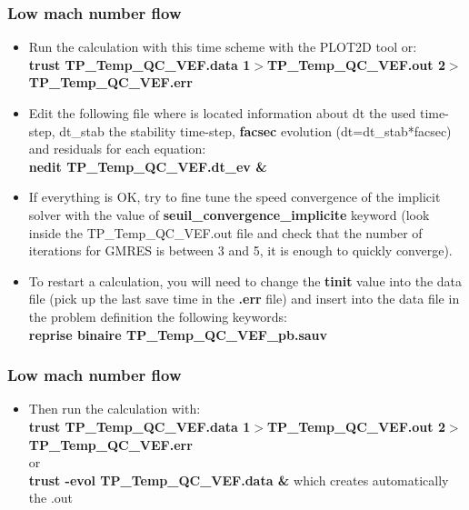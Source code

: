 \documentclass[10pt, hyperref={unicode=true,pdfusetitle, bookmarks=true,bookmarksnumbered=false,bookmarksopen=false, breaklinks=false,pdfborder={0 0 1},backref=true,colorlinks=true,linkcolor=darkblue,pageanchor}]{beamer}
\begin{document}
\begin{frame}
\frametitle{Low mach number flow}
\begin{block}{}

\begin{itemize}
\item Run the calculation with this time scheme with the PLOT2D tool or: \\
{\footnotesize{\textbf{trust TP\_Temp\_QC\_VEF.data 1$>$TP\_Temp\_QC\_VEF.out 2$>$TP\_Temp\_QC\_VEF.err}}}

\item Edit the following file where is located information about dt the used time-step, dt\_stab the stability time-step, \textbf{facsec} evolution (dt=dt\_stab*facsec) and residuals for each equation: \\
\textbf{nedit TP\_Temp\_QC\_VEF.dt\_ev \&}

\item  If everything is OK, try to fine tune the speed convergence of the implicit solver with the value of \textbf{seuil\_convergence\_implicite} keyword (look inside the TP\_Temp\_QC\_VEF.out file and check that the number of iterations for GMRES is between 3 and 5, it is enough to quickly converge).

\item  To restart a calculation, you will need to change the \textbf{tinit} value into the data file (pick up the last save time in the \textbf{.err} file) and insert into the data file in the problem definition the following keywords: \\
\textbf{reprise binaire TP\_Temp\_QC\_VEF\_pb.sauv}
\end{itemize}

\end{block}
\end{frame}
\begin{frame}
\frametitle{Low mach number flow}
\begin{block}{}

\begin{itemize}

\item  Then run the calculation with: \\
{\footnotesize{\textbf{trust TP\_Temp\_QC\_VEF.data 1$>$TP\_Temp\_QC\_VEF.out 2$>$TP\_Temp\_QC\_VEF.err}}} \\
or \\
\textbf{trust -evol TP\_Temp\_QC\_VEF.data \&} which creates automatically the .out

\end{itemize}

\end{block}
\end{frame}
\end{document}
